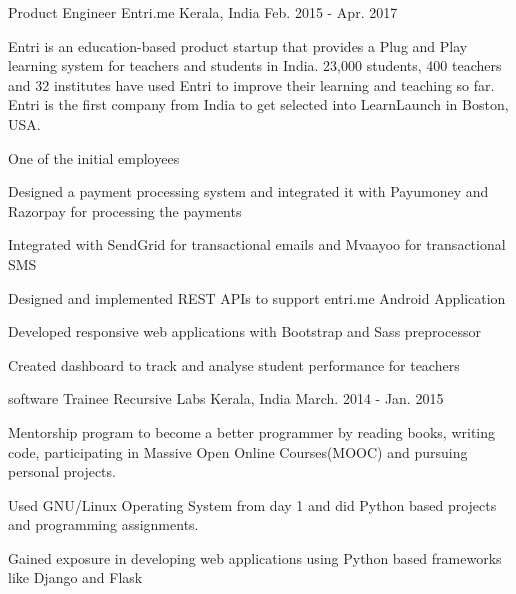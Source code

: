 \begin{cvexperiences}

  \cvexperience
    {Product Engineer} %
    {Entri.me} %
    {Kerala, India} %
    {Feb. 2015 - Apr. 2017} %
    {\begin{cvparagraph} %
      Entri is an education-based product startup that provides a Plug and Play learning system for teachers and students in India. 23,000 students, 400 teachers and 32 institutes have used Entri to improve their learning and teaching so far. Entri is the first company from India to get selected into LearnLaunch in Boston, USA.
\end{cvparagraph}
}    {
      \begin{cvitems} %
        \item {One of the initial employees}
        \item {Designed a payment processing system and integrated it with Payumoney and Razorpay for processing the payments}
        \item{Integrated with SendGrid for transactional emails and Mvaayoo for transactional SMS}
        \item{Designed and implemented REST APIs to support entri.me Android Application}
        \item{Developed responsive web applications with Bootstrap and Sass preprocessor}
        \item{Created dashboard to track and analyse student performance for teachers}
      \end{cvitems}
    }

  \cvexperience
    {software Trainee} %
    {Recursive Labs} %
    {Kerala, India} %
    {March. 2014 - Jan. 2015} %
    {\begin{cvparagraph} %
      Mentorship program to become a better programmer by reading books, writing code, participating in Massive Open Online Courses(MOOC) and pursuing personal projects.
\end{cvparagraph}
}
    {
      \begin{cvitems} %
        \item {Used GNU/Linux Operating System from day 1 and did Python based projects and programming assignments.}
        \item {Gained exposure in developing web applications using Python based frameworks like Django and Flask}
      \end{cvitems}
    }

\end{cvexperiences}
\vspace{19mm}
